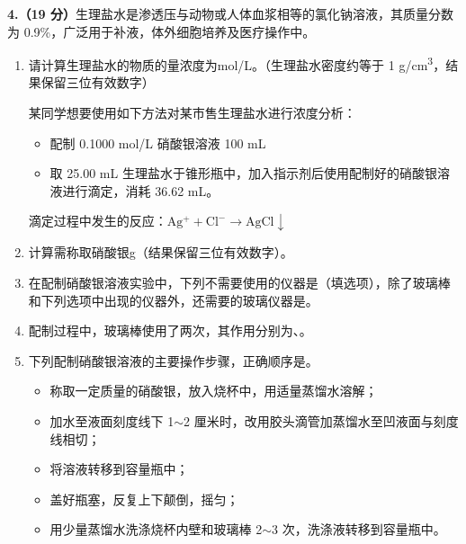 \documentclass[11pt,a4paper]{article}
\begin{document}

\noindent\textbf{4.（19 分）}生理盐水是渗透压与动物或人体血浆相等的氯化钠溶液，其质量分数为 0.9\%，广泛用于补液，体外细胞培养及医疗操作中。

\begin{enumerate}[label=（\arabic*）]
\item 请计算生理盐水的物质的量浓度为\blank[3.5em]mol/L。（生理盐水密度约等于 1 g/cm\textsuperscript{3}，结果保留三位有效数字）

某同学想要使用如下方法对某市售生理盐水进行浓度分析：
\begin{itemize}[leftmargin=2em,itemsep=0.1em]
\item[ \textcircled{1} ] 配制 0.1000 mol/L 硝酸银溶液 100 mL
\item[ \textcircled{2} ] 取 25.00 mL 生理盐水于锥形瓶中，加入指示剂后使用配制好的硝酸银溶液进行滴定，消耗 36.62 mL。
\end{itemize}
滴定过程中发生的反应：$\mathrm{Ag^{+} + Cl^{-} \longrightarrow AgCl \downarrow}$

\item 计算需称取硝酸银\blank[3.5em]g（结果保留三位有效数字）。

\item 在配制硝酸银溶液实验中，下列不需要使用的仪器是\blank[3em]（填选项），除了玻璃棒和下列选项中出现的仪器外，还需要的玻璃仪器是\blank[4em]。

\item 配制过程中，玻璃棒使用了两次，其作用分别为\blank[6em]、\blank[6em]。

\item 下列配制硝酸银溶液的主要操作步骤，正确顺序是\blank[3em]。
\begin{itemize}[leftmargin=2em,itemsep=0.1em]
\item[ \textcircled{1} ] 称取一定质量的硝酸银，放入烧杯中，用适量蒸馏水溶解；
\item[ \textcircled{2} ] 加水至液面刻度线下 1$\sim$2 厘米时，改用胶头滴管加蒸馏水至凹液面与刻度线相切；
\item[ \textcircled{3} ] 将溶液转移到容量瓶中；
\item[ \textcircled{4} ] 盖好瓶塞，反复上下颠倒，摇匀；
\item[ \textcircled{5} ] 用少量蒸馏水洗涤烧杯内壁和玻璃棒 2$\sim$3 次，洗涤液转移到容量瓶中。
\end{itemize}


\end{enumerate}
\end{document}
